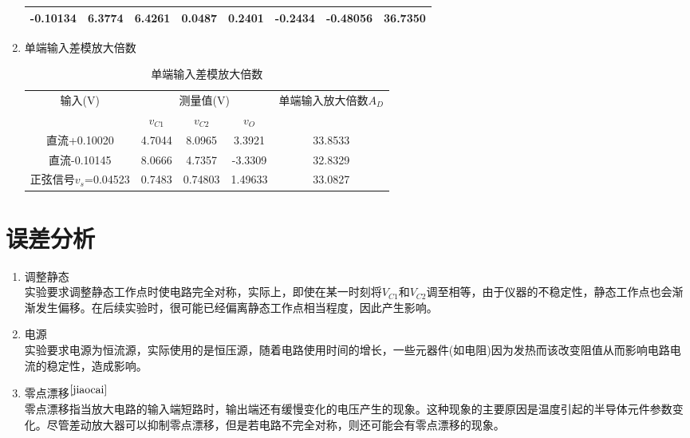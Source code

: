 \documentclass[a4paper]{article}
\begin{document}
\begin{enumerate}
\begin{table}[!h]
\begin{tabular}{|c|c|c|c|c|c|c|c|}
-0.10134               & 6.3774   & 6.4261   & 0.0487  & 0.2401   & -0.2434  & -0.48056 & 36.7350 \\ \hline
\end{tabular}
\end{table}
\item 单端输入差模放大倍数\\
\begin{table}[!h]
\centering
\caption{单端输入差模放大倍数}
\label{AD1table}
\begin{tabular}{|c|c|c|c|c|}
\hline
\multirow{2}{*}{输入(V)} & \multicolumn{3}{c|}{测量值(V)}   & \multirow{2}{*}{单端输入放大倍数$A_D$} \\ \cline{2-4}
                       & $v_{C1}$ & $v_{C2}$ & $v_{O}$ &                                \\ \hline
直流+0.10020             & 4.7044   & 8.0965   & 3.3921  & 33.8533                        \\ \hline
直流-0.10145               & 8.0666   & 4.7357   & -3.3309 & 32.8329                        \\ \hline
正弦信号$v_{s}$=0.04523    & 0.7483   & 0.74803  & 1.49633 & 33.0827                        \\ \hline
\end{tabular}
\end{table}
\end{enumerate}

\section{误差分析}
\begin{enumerate}
\item 调整静态\\
实验要求调整静态工作点时使电路完全对称，实际上，即使在某一时刻将$V_{C1}$和$V_{C2}$调至相等，由于仪器的不稳定性，静态工作点也会渐渐发生偏移。在后续实验时，很可能已经偏离静态工作点相当程度，因此产生影响。
\item 电源\\
实验要求电源为恒流源，实际使用的是恒压源，随着电路使用时间的增长，一些元器件(如电阻)因为发热而该改变阻值从而影响电路电流的稳定性，造成影响。
\item 零点漂移$^{\cite{jiaocai}}$\\
零点漂移指当放大电路的输入端短路时，输出端还有缓慢变化的电压产生的现象。这种现象的主要原因是温度引起的半导体元件参数变化。尽管差动放大器可以抑制零点漂移，但是若电路不完全对称，则还可能会有零点漂移的现象。
\end{enumerate}
\end{document}
